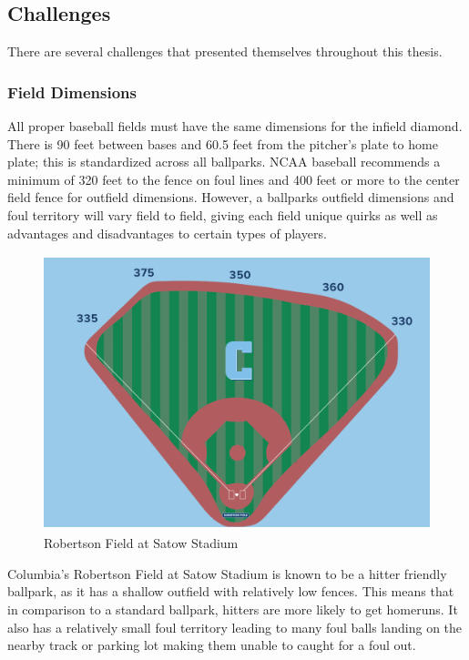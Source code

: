 \documentclass{article}
\begin{document}
\subsection{Challenges}

There are several challenges that presented themselves throughout this thesis. 

\subsubsection{Field Dimensions}
All proper baseball fields must have the same dimensions for the infield diamond. There is 90 feet between bases and 60.5 feet from the pitcher's plate to home plate; this is standardized across all ballparks. NCAA baseball recommends a minimum of 320 feet to the fence on foul lines and 400 feet or more to the center field fence for outfield dimensions. However, a ballparks outfield dimensions and foul territory will vary field to field, giving each field unique quirks as well as advantages and disadvantages to certain types of players.

\vspace{1cm}
\begin{figure}[h]
    \centering        
    \includegraphics[height=8cm]{images/columbia_field.png}
    \caption{Robertson Field at Satow Stadium}
\end{figure}
\vspace{1cm}

Columbia's Robertson Field at Satow Stadium is known to be a hitter friendly ballpark, as it has a shallow outfield with relatively low fences. This means that in comparison to a standard ballpark, hitters are more likely to get homeruns. It also has a relatively small foul territory leading to many foul balls landing on the nearby track or parking lot making them unable to caught for a foul out.  
\end{document}
